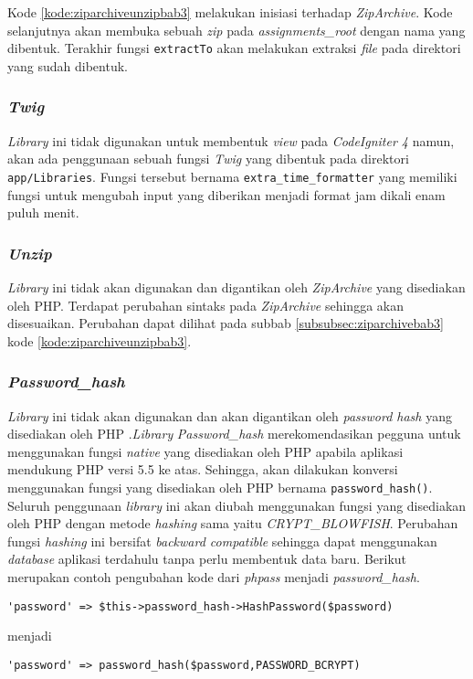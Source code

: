 Kode \ref{kode:ziparchiveunzipbab3} melakukan inisiasi terhadap \textit{ZipArchive}. Kode selanjutnya akan membuka sebuah \textit{zip} pada \textit{assignments\_root} dengan nama yang dibentuk. Terakhir fungsi \texttt{extractTo} akan melakukan extraksi \textit{file} pada direktori yang sudah dibentuk.

\subsubsection{\textit{Twig}}
\textit{Library} ini tidak digunakan untuk membentuk \textit{view} pada \textit{CodeIgniter 4} namun, akan ada penggunaan sebuah fungsi \textit{Twig} yang dibentuk pada direktori \texttt{app/Libraries}. Fungsi tersebut bernama \texttt{extra\_time\_formatter} yang memiliki fungsi untuk mengubah input yang diberikan menjadi format jam dikali enam puluh menit. 

\subsubsection{\textit{Unzip}}
\textit{Library} ini tidak akan digunakan dan digantikan oleh \textit{ZipArchive} yang disediakan oleh PHP. Terdapat perubahan sintaks pada \textit{ZipArchive} sehingga akan disesuaikan. Perubahan dapat dilihat pada subbab \ref{subsubsec:ziparchivebab3} kode \ref{kode:ziparchiveunzipbab3}.

\subsubsection{\textit{Password\_hash}}
\textit{Library} ini tidak akan digunakan dan akan digantikan oleh \textit{password hash} yang disediakan oleh PHP .\textit{Library} \textit{Password\_hash} merekomendasikan pegguna untuk menggunakan fungsi \textit{native} yang disediakan oleh PHP apabila aplikasi mendukung PHP versi 5.5 ke atas. Sehingga, akan dilakukan konversi menggunakan fungsi yang disediakan oleh PHP bernama \texttt{password\_hash()}. Seluruh penggunaan \textit{library} ini akan diubah menggunakan fungsi yang disediakan oleh PHP dengan metode \textit{hashing} sama yaitu \textit{CRYPT\_BLOWFISH}. Perubahan fungsi \textit{hashing} ini bersifat \textit{backward compatible} sehingga dapat menggunakan \textit{database} aplikasi terdahulu tanpa perlu membentuk data baru. Berikut merupakan contoh pengubahan kode dari \textit{phpass} menjadi \textit{password\_hash}.

\begin{center}
\verb|'password' => $this->password_hash->HashPassword($password)|
\end{center}
menjadi
\begin{center}
\verb|'password' => password_hash($password,PASSWORD_BCRYPT)|
\end{center}

